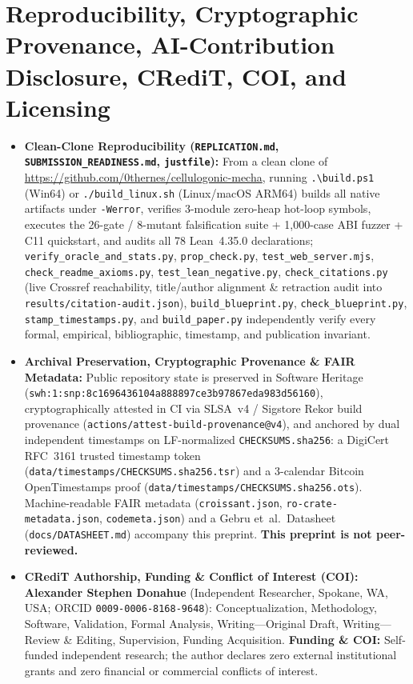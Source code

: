 \documentclass[11pt,reqno]{amsart}
\theoremstyle{plain}
\theoremstyle{definition}
\theoremstyle{remark}
\newcommand{\code}[1]{{\footnotesize\nolinkurl{#1}}}
\begin{document}
\section{Reproducibility, Cryptographic Provenance, AI-Contribution Disclosure, CRediT, COI, and Licensing}
\label{sec:repro}

\begin{itemize}[leftmargin=1.6em, itemsep=2pt]
  \item \textbf{Clean-Clone Reproducibility (\code{REPLICATION.md}, \code{SUBMISSION_READINESS.md}, \code{justfile}):} From a clean clone of \url{https://github.com/0thernes/cellulogonic-mecha}, running \texttt{.\textbackslash build.ps1} (Win64) or \code{./build_linux.sh} (Linux/macOS ARM64) builds all native artifacts under \code{-Werror}, verifies 3-module zero-heap hot-loop symbols, executes the 26-gate / 8-mutant falsification suite + 1,000-case ABI fuzzer + C11 quickstart, and audits all 78 Lean~4.35.0 declarations; \code{verify_oracle_and_stats.py}, \code{prop_check.py}, \code{test_web_server.mjs}, \code{check_readme_axioms.py}, \code{test_lean_negative.py}, \code{check_citations.py} (live Crossref reachability, title/author alignment \& retraction audit into \code{results/citation-audit.json}), \code{build_blueprint.py}, \code{check_blueprint.py}, \code{stamp_timestamps.py}, and \code{build_paper.py} independently verify every formal, empirical, bibliographic, timestamp, and publication invariant.
  \item \textbf{Archival Preservation, Cryptographic Provenance \& FAIR Metadata:} Public repository state is preserved in Software Heritage (\code{swh:1:snp:8c1696436104a888897ce3b97867eda983d56160}), cryptographically attested in CI via SLSA~v4 / Sigstore Rekor build provenance (\code{actions/attest-build-provenance@v4}), and anchored by dual independent timestamps on LF-normalized \code{CHECKSUMS.sha256}: a DigiCert RFC~3161 trusted timestamp token (\code{data/timestamps/CHECKSUMS.sha256.tsr}) and a 3-calendar Bitcoin OpenTimestamps proof (\code{data/timestamps/CHECKSUMS.sha256.ots}). Machine-readable FAIR metadata (\code{croissant.json}, \code{ro-crate-metadata.json}, \code{codemeta.json}) and a Gebru et~al.\ Datasheet (\code{docs/DATASHEET.md}) accompany this preprint. \textbf{This preprint is not peer-reviewed.}
  \item \textbf{CRediT Authorship, Funding \& Conflict of Interest (COI):} \textbf{Alexander Stephen Donahue} (Independent Researcher, Spokane, WA, USA; ORCID \code{0009-0006-8168-9648}): Conceptualization, Methodology, Software, Validation, Formal Analysis, Writing---Original Draft, Writing---Review \& Editing, Supervision, Funding Acquisition. \textbf{Funding \& COI:} Self-funded independent research; the author declares zero external institutional grants and zero financial or commercial conflicts of interest.

\end{itemize}
\end{document}
